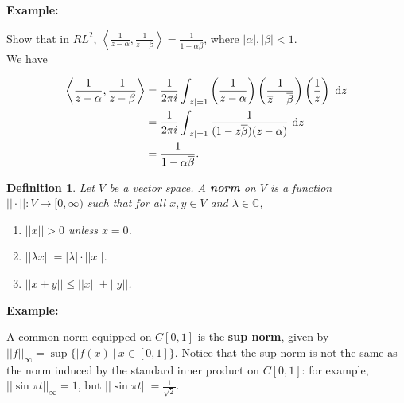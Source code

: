 \documentclass{article}
\theoremstyle{colontheorem}
\newtheorem{definition}[theorem]{Definition}
\newenvironment{Def}
{
	\begin{mdframed}[backgroundcolor=DefGreen!10]
	\begin{definition}
}
{
	\end{definition}
	\end{mdframed}
	
	\vspace{.15in}
}
\newenvironment{Example}
{
	\begin{mdframed}
	\textbf{Example:}%
}
{
	\end{mdframed}
	
	\vspace{.15in}
}
\begin{document}
\begin{Example}
	Show that in $RL^2$, $\left< \frac{1}{z - \alpha}, \frac{1}{z - \beta} \right> = \frac{1}{1 - \alpha \overline{\beta}}$, where $|\alpha|, |\beta| < 1$.\\
	
	We have
	
	\begin{align*}
		\left< \frac{1}{z - \alpha}, \frac{1}{z - \beta} \right> &= \frac{1}{2 \pi i} \int_{|z| = 1} \left( \frac{1}{z - \alpha} \right) \left( \frac{1}{\overline{z} - \overline{\beta}} \right) \left( \frac{1}{z} \right)\ \textnormal{d}z\\
		&= \frac{1}{2 \pi i} \int_{|z| = 1} \frac{1}{(1 - z \overline{\beta})(z - \alpha)}\ \textnormal{d}z\\
		&= \frac{1}{1 - \alpha \overline{\beta}}.
	\end{align*}
	
\end{Example}



\begin{Def}
	
	Let $V$ be a vector space. A \textbf{norm} on $V$ is a function $|| \cdot || : V \longrightarrow [0, \infty)$ such that for all $x, y \in V$ and $\lambda \in \mathbb{C}$,
	
	\begin{enumerate}
		
		\item $||x|| > 0$ unless $x = 0$.
		
		\item $||\lambda x|| = |\lambda| \cdot ||x||$.
		
		\item $||x + y|| \leq ||x|| + ||y||$.
		
	\end{enumerate}
	
\end{Def}



\begin{Example}
	A common norm equipped on $C[0, 1]$ is the \textbf{sup norm}, given by $||f||_\infty = \sup \{|f(x)\ |\ x \in [0, 1]\}$. Notice that the sup norm is not the same as the norm induced by the standard inner product on $C[0, 1]$: for example, $||\sin \pi t ||_\infty = 1$, but $||\sin \pi t|| = \frac{1}{\sqrt{2}}$.
	
\end{Example}
\end{document}
